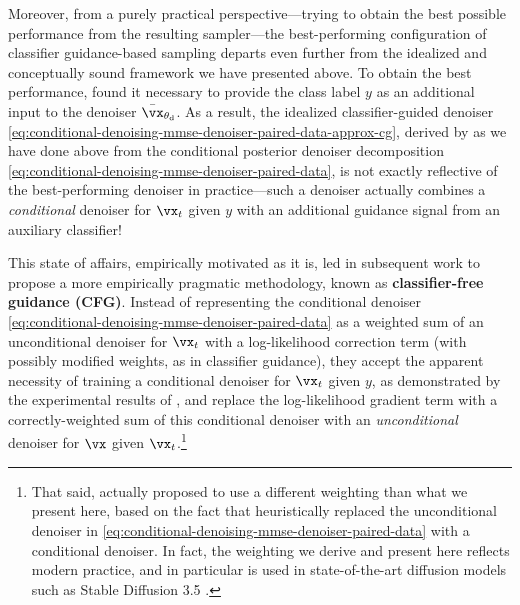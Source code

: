 \documentclass[../../book-main.tex]{subfiles}
\begin{document}
Moreover, from a purely practical perspective---trying to obtain the best
possible performance from the resulting sampler---the best-performing
configuration of classifier guidance-based sampling departs even further from
the idealized and conceptually sound framework we have presented above.
To obtain the best performance, \citet{Dhariwal2021-hg} found it
necessary to provide the class label $y$ as an additional input to the denoiser
$\bar{\vx}_{\theta_{\mathrm{d}}}$. As a result, the idealized classifier-guided
denoiser \eqref{eq:conditional-denoising-mmse-denoiser-paired-data-approx-cg},
derived by \citet{Dhariwal2021-hg} as we have done above from the conditional
posterior denoiser decomposition
\eqref{eq:conditional-denoising-mmse-denoiser-paired-data}, is not exactly
reflective of the best-performing denoiser in practice---such a denoiser
actually combines a \textit{conditional} denoiser for $\vx_t$ given $y$ with an
additional guidance signal from an auxiliary classifier!

This state of affairs, empirically motivated as it is, led \citet{Ho2022-ry} in
subsequent work to propose a more empirically pragmatic methodology, known as
\textbf{classifier-free guidance (CFG)}. Instead of representing the
conditional denoiser
\eqref{eq:conditional-denoising-mmse-denoiser-paired-data} as a weighted sum
of an unconditional denoiser for $\vx_t$ with a log-likelihood correction term
(with possibly modified weights, as in classifier guidance), they accept the
apparent necessity of training a conditional denoiser for $\vx_t$ given $y$, as
demonstrated by the experimental results of \citet{Dhariwal2021-hg}, and replace
the log-likelihood gradient term with a correctly-weighted sum of this
conditional denoiser with an \textit{unconditional} denoiser for $\vx$ given
$\vx_t$.\footnote{That said, \textcite{Ho2022-ry} actually proposed to use
    a different weighting than what we present here, based on the fact that
    \textcite{Dhariwal2021-hg} heuristically replaced the
    unconditional denoiser in
    \eqref{eq:conditional-denoising-mmse-denoiser-paired-data} with
    a conditional denoiser. In fact, the weighting we derive and present here
    reflects modern practice, and in particular is used in state-of-the-art
    diffusion models such as Stable Diffusion 3.5
\cite{DBLP:conf/icml/EsserKBEMSLLSBP24}.}
\end{document}
